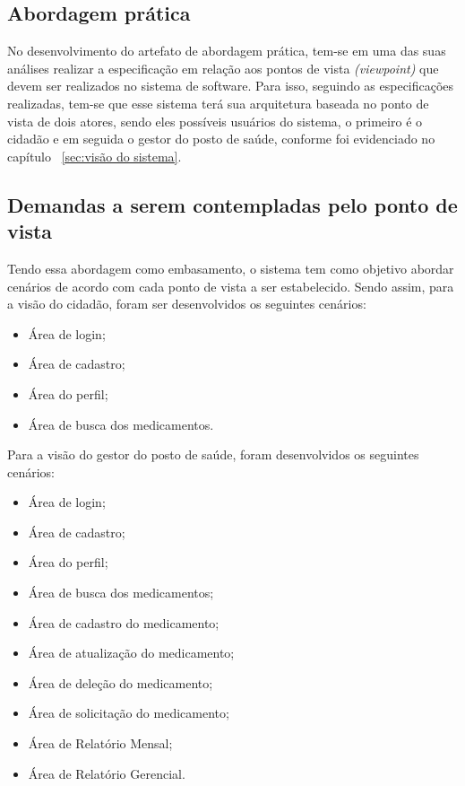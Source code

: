 \subsection{Abordagem prática}
No desenvolvimento do artefato de abordagem prática, tem-se em uma das suas análises realizar a especificação em relação aos pontos de vista \emph{(viewpoint)} que devem ser realizados no sistema de software. Para isso, seguindo as especificações realizadas, tem-se que esse sistema terá sua arquitetura baseada no ponto de vista de dois atores, sendo eles possíveis usuários do sistema, o primeiro é o cidadão e em seguida o gestor do posto de saúde, conforme foi evidenciado no capítulo  ~\ref{sec:visão do sistema}.

\subsection{Demandas a serem contempladas pelo ponto de vista}

Tendo essa abordagem como embasamento, o sistema tem como objetivo abordar cenários de acordo com cada ponto de vista a ser estabelecido. Sendo assim, para a visão do cidadão, foram ser desenvolvidos os seguintes cenários:
\begin{itemize}
    \item Área de login;
    \item Área de cadastro;
    \item Área do perfil;
    \item Área de busca dos medicamentos.
\end{itemize}

Para a visão do gestor do posto de saúde, foram desenvolvidos os seguintes cenários:

\begin{itemize}
    \item Área de login;
    \item Área de cadastro;
    \item Área do perfil;
    \item Área de busca dos medicamentos;
    \item Área de cadastro do medicamento;
    \item Área de atualização do medicamento;
    \item Área de deleção do medicamento;
    \item Área de solicitação do medicamento;
    \item Área de Relatório Mensal;
    \item Área de Relatório Gerencial.
\end{itemize}

